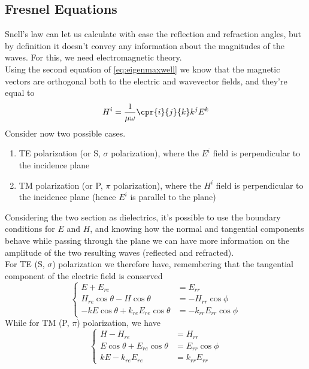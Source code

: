 \documentclass[../electromagnetism.tex]{subfiles}
\begin{document}
\subsection{Fresnel Equations}
Snell's law can let us calculate with ease the reflection and refraction angles, but by definition it doesn't convey any information about the magnitudes of the waves. For this, we need electromagnetic theory.\\
Using the second equation of \eqref{eq:eigenmaxwell} we know that the magnetic vectors are orthogonal both to the electric and wavevector fields, and they're equal to
\begin{equation}
	H^i=\frac{1}{\mu\omega}\cpr{i}{j}{k}k^jE^k
	\label{eq:magvecfresnel}
\end{equation}
Consider now two possible cases.
\begin{enumerate}
\item TE polarization (or S, $\sigma$ polarization), where the $E^i$ field is perpendicular to the incidence plane
\item TM polarization (or P, $\pi$ polarization), where the $H^i$ field is perpendicular to the incidence plane (hence $E^i$ is parallel to the plane)
\end{enumerate}
Considering the two section as dielectrics, it's possible to use the boundary conditions for $E$ and $H$, and knowing how the normal and tangential components behave while passing through the plane we can have more information on the amplitude of the two resulting waves (reflected and refracted).\\
For TE (S, $\sigma$) polarization we therefore have, remembering that the tangential component of the electric field is conserved 
\begin{equation}
	\left\{ \begin{aligned}
			E+E_{re}&=E_{rr}\\
			H_{re}\cos\theta-H\cos\theta&=-H_{rr}\cos\phi\\
			-kE\cos\theta+k_{re}E_{re}\cos\theta&=-k_{rr}E_{rr}\cos\phi
	\end{aligned}\right.
	\label{eq:TEpoleqn}
\end{equation}
While for TM (P, $\pi$) polarization, we have
\begin{equation}
	\left\{ \begin{aligned}
			H-H_{re}&=H_{rr}\\
			E\cos\theta+E_{re}\cos\theta&=E_{rr}\cos\phi\\
			kE-k_{re}E_{re}&=k_{rr}E_{rr}
	\end{aligned}\right.
	\label{eq:TMpoleqn}
\end{equation}
\end{document}
